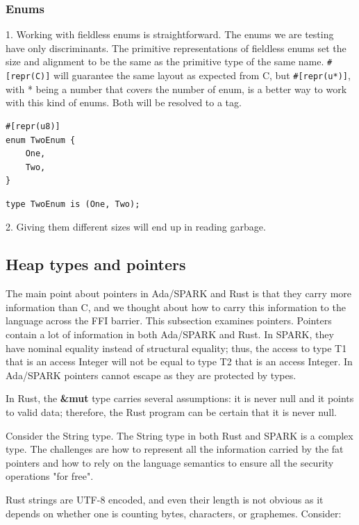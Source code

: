 \documentclass[nomenclature, english, bibtex]{kththesis}
\begin{document}
\subsubsection{Enums}

1. Working with fieldless enums is straightforward. 
The enums we are testing have only discriminants. The primitive representations of fieldless enums set the size and alignment to be the same as the primitive type of the same name. \texttt{\#[repr(C)]} will guarantee the same layout as expected from C, but \texttt{\#[repr(u*)]}, with * being a number that covers the number of enum, is a better way to work with this kind of enums. Both will be resolved to a tag.
\begin{verbatim}
#[repr(u8)] 
enum TwoEnum {
    One,
    Two,
}  
\end{verbatim}

\begin{verbatim}
type TwoEnum is (One, Two);
\end{verbatim}

2. Giving them different sizes will end up in reading garbage.


\subsection{Heap types and pointers}

The main point about pointers in Ada/SPARK and Rust is that they carry more information than C, and we thought about how to carry this information to the language across the FFI barrier.
This subsection examines pointers. Pointers contain a lot of information in both Ada/SPARK and Rust. 
In SPARK, they have nominal equality instead of structural equality; thus, the access to type T1 that is an access Integer will not be equal to type T2 that is an access Integer. 
In Ada/SPARK pointers cannot escape as they are protected by types. 

In Rust, the \textbf{\&mut} type carries several assumptions: \first it is never null and \Second it points to valid data; therefore, the Rust program can be certain that it is never null. 

Consider the String type. The String type in both Rust and SPARK is a complex type. The challenges are how to represent all the information carried by the fat pointers and how to rely on the language semantics to ensure all the security operations "for free".

Rust strings are UTF-8 encoded, and even their length is not obvious as it depends on whether one is counting bytes, characters, or graphemes. Consider:
\end{document}
